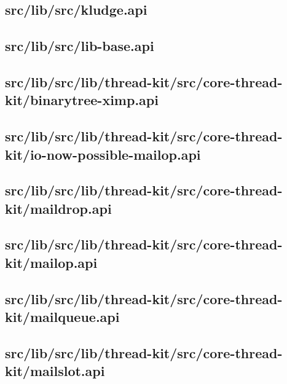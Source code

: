\subsection{src/lib/src/kludge.api}


\subsection{src/lib/src/lib-base.api}


\subsection{src/lib/src/lib/thread-kit/src/core-thread-kit/binarytree-ximp.api}


\subsection{src/lib/src/lib/thread-kit/src/core-thread-kit/io-now-possible-mailop.api}


\subsection{src/lib/src/lib/thread-kit/src/core-thread-kit/maildrop.api}


\subsection{src/lib/src/lib/thread-kit/src/core-thread-kit/mailop.api}


\subsection{src/lib/src/lib/thread-kit/src/core-thread-kit/mailqueue.api}


\subsection{src/lib/src/lib/thread-kit/src/core-thread-kit/mailslot.api}


